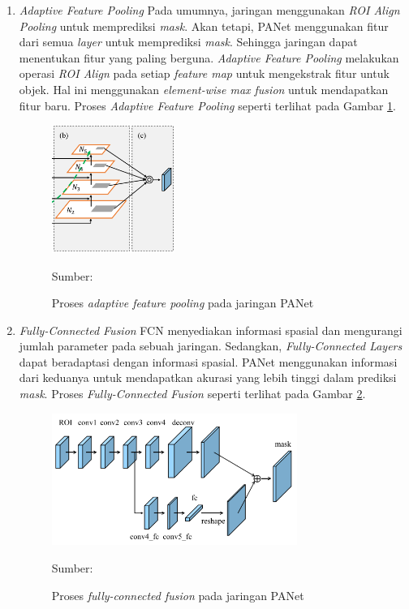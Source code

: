\begin{enumerate}
        \item \textit{Adaptive Feature Pooling}
        Pada umumnya, jaringan menggunakan \textit{ROI Align Pooling} untuk memprediksi \textit{mask}. Akan tetapi, PANet menggunakan fitur dari semua \textit{layer} untuk memprediksi \textit{mask}. Sehingga jaringan dapat menentukan fitur yang paling berguna. \textit{Adaptive Feature Pooling} melakukan operasi \textit{ROI Align} pada setiap \textit{feature map} untuk mengekstrak fitur untuk objek. Hal ini menggunakan \textit{element-wise max fusion} untuk mendapatkan fitur baru. Proses \textit{Adaptive Feature Pooling} seperti terlihat pada Gambar \ref{fig:adaptive-feature-pooling}.
        \begin{figure}[H]
            \begin{center}
                \includegraphics[width=4cm]{../img/PANet Adaptive Feature Pooling - Latex.png}
                \caption{Proses \textit{adaptive feature pooling} pada jaringan PANet}
                \label{fig:adaptive-feature-pooling}
                Sumber: \citep{Liu2018}
            \end{center}
        \end{figure}

        \item \textit{Fully-Connected Fusion}
        FCN menyediakan informasi spasial dan mengurangi jumlah parameter pada sebuah jaringan. Sedangkan, \textit{Fully-Connected Layers} dapat beradaptasi dengan informasi spasial. PANet menggunakan informasi dari keduanya untuk mendapatkan akurasi yang lebih tinggi dalam prediksi \textit{mask}. Proses \textit{Fully-Connected Fusion} seperti terlihat pada Gambar \ref{fig:fully-connected-fusion}.
        \begin{figure}[H]
            \begin{center}
                \includegraphics[width=8cm]{../img/PANet Fully Connected Fusion - Latex.png}
                \caption{Proses \textit{fully-connected fusion} pada jaringan PANet}
                \label{fig:fully-connected-fusion}
                Sumber: \citep{Liu2018}
            \end{center}
        \end{figure}


\end{enumerate}

